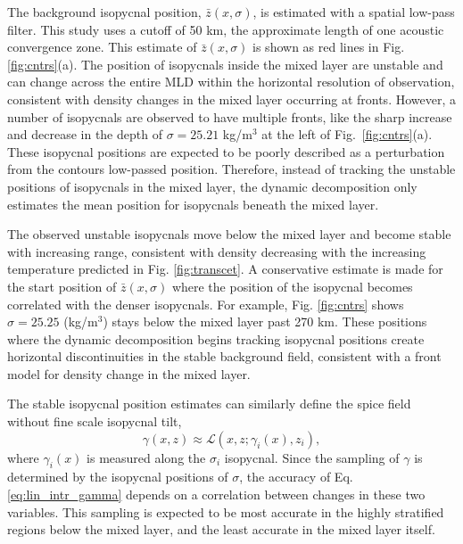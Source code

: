 \documentclass[preprint,NumberedRefs]{JASA}
\begin{document}
The background isopycnal position, $\bar{z}(x, \sigma)$, is estimated with a spatial low-pass filter. This study uses a cutoff of 50 km, the approximate length of one acoustic convergence zone\cite{jensen2011computational}. This estimate of $\bar{z}(x, \sigma)$ is shown as red lines in Fig. \ref{fig:cntrs}(a). The position of isopycnals inside the mixed layer are unstable and can change across the entire MLD within the horizontal resolution of observation, consistent with density changes in the mixed layer occurring at fronts. However, a number of isopycnals are observed to have multiple fronts, like the sharp increase and decrease in the depth of $\sigma=25.21$ kg/m$^3$ at the left of Fig.~\ref{fig:cntrs}(a). These isopycnal positions are expected to be poorly described as a perturbation from the contours low-passed position. Therefore, instead of tracking the unstable positions of isopycnals in the mixed layer, the dynamic decomposition only estimates the mean position for isopycnals beneath the mixed layer.

The observed unstable isopycnals move below the mixed layer and become stable with increasing range, consistent with density decreasing with the increasing temperature predicted in Fig. \ref{fig:transcet}. A conservative estimate is made for the start position of $\bar{z}(x, \sigma)$ where the position of the isopycnal becomes correlated with the denser isopycnals. For example, Fig. \ref{fig:cntrs} shows $\sigma=25.25$ (kg/m$^3$) stays below the mixed layer past 270 km. These positions where the dynamic decomposition begins tracking isopycnal positions create horizontal discontinuities in the stable background field, consistent with a front model for density change in the mixed layer.

The stable isopycnal position estimates can similarly define the spice field without fine scale isopycnal tilt,
\begin{equation}
    \gamma(x, z)\approx\mathcal{L}(x, z; \gamma_i(x), z_i),
    \label{eq:lin_intr_gamma}
\end{equation}
where $\gamma_i(x)$ is measured along the $\sigma_i$ isopycnal. Since the sampling of $\gamma$ is determined by the isopycnal positions of $\sigma$, the accuracy of Eq. \eqref{eq:lin_intr_gamma} depends on a correlation between changes in these two variables. This sampling is expected to be most accurate in the highly stratified regions below the mixed layer, and the least accurate in the mixed layer itself.
\end{document}
